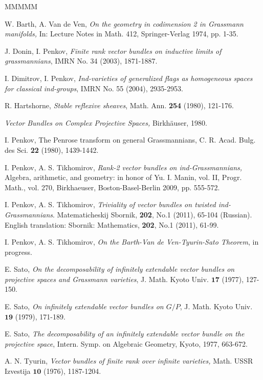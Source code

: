 \documentclass[12pt]{amsart}
\theoremstyle{definition}
\begin{document}
\begin{thebibliography}{MMMMM}

 W. Barth, A. Van de Ven, {\it On the geometry in codimension 2 in Grassmann
manifolds,} In: Lecture Notes in Math. 412, Springer-Verlag 1974, pp. 1-35.

 J. Donin, I. Penkov, {\it Finite rank vector bundles on inductive limits of
grassmannians}, IMRN No. 34 (2003), 1871-1887.

 I. Dimitrov, I. Penkov, {\it Ind-varieties of generalized flags as homogeneous
spaces for classical ind-groups}, IMRN  No. 55 (2004), 2935-2953.

 R. Hartshorne, {\it Stable reflexive sheaves}, Math. Ann. {\bf 254} (1980), 121-176.

 {\it Vector Bundles on Complex
Projective Spaces,} Birkh\"auser, 1980.

 I. Penkov, The Penrose transform on general Grassmannians, C. R. Acad. Bulg. des Sci. \textbf{22} (1980),
1439-1442.

 I. Penkov, A. S. Tikhomirov, {\it Rank-2 vector bundles on ind-Grassmannians,} Algebra, arithmetic, and geometry: in honor
of Yu. I. Manin, vol. II, Progr. Math., vol. 270, Birkhaeuser, Boston-Basel-Berlin 2009, pp. 555-572.

 I. Penkov, A. S. Tikhomirov, {\it Triviality of vector bundles on twisted ind-Grassmannians}.
Matematicheskij Sbornik, {\bf 202}, No.1 (2011), 65-104 (Russian). English translation:
Sbornik: Mathematics, {\bf 202}, No.1 (2011), 61-99.

 I. Penkov, A. S. Tikhomirov, {\it On the Barth-Van de Ven-Tyurin-Sato Theorem}, in progress.


 E. Sato, {\it On the decomposability of infinitely extendable vector bundles on
projective spaces and Grassmann varieties},  J. Math. Kyoto Univ. $\mathbf{17}$
(1977), 127-150.

 E. Sato, {\it On infinitely extendable vector bundles on $G/P$}, J. Math. Kyoto
Univ. $\mathbf{19}$ (1979), 171-189.

 E. Sato, {\it The decomposability of an infinitely extendable vector bundle on
the projective space},  Intern. Symp. on Algebraic Geometry, Kyoto, 1977, 663-672.

 A. N. Tyurin, {\it Vector bundles of finite rank over infinite varieties,} Math.
USSR Izvestija $\mathbf{10}$ (1976), 1187-1204.

\end{thebibliography}
\end{document}
